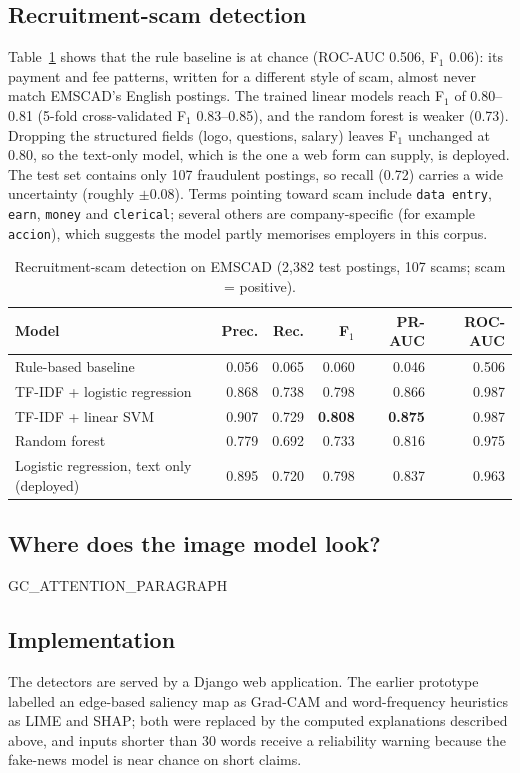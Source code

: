 \documentclass[runningheads]{llncs}
\begin{document}
\subsection{Recruitment-scam detection}
Table~\ref{tab:job} shows that the rule baseline is at chance (ROC-AUC 0.506, F$_1$ 0.06): its payment and fee patterns, written for a different style of scam, almost never match EMSCAD's English postings. The trained linear models reach F$_1$ of 0.80--0.81 (5-fold cross-validated F$_1$ 0.83--0.85), and the random forest is weaker (0.73). Dropping the structured fields (logo, questions, salary) leaves F$_1$ unchanged at 0.80, so the text-only model, which is the one a web form can supply, is deployed. The test set contains only 107 fraudulent postings, so recall (0.72) carries a wide uncertainty (roughly $\pm0.08$). Terms pointing toward scam include \texttt{data entry}, \texttt{earn}, \texttt{money} and \texttt{clerical}; several others are company-specific (for example \texttt{accion}), which suggests the model partly memorises employers in this corpus.

\begin{table}[t]
\caption{Recruitment-scam detection on EMSCAD (2,382 test postings, 107 scams; scam = positive).}\label{tab:job}
\centering
\begin{tabular}{lrrrrr}
\toprule
Model & Prec. & Rec. & F$_1$ & PR-AUC & ROC-AUC \\
\midrule
Rule-based baseline & 0.056 & 0.065 & 0.060 & 0.046 & 0.506 \\
TF-IDF + logistic regression & 0.868 & 0.738 & 0.798 & 0.866 & 0.987 \\
TF-IDF + linear SVM & 0.907 & 0.729 & \textbf{0.808} & \textbf{0.875} & 0.987 \\
Random forest & 0.779 & 0.692 & 0.733 & 0.816 & 0.975 \\
Logistic regression, text only (deployed) & 0.895 & 0.720 & 0.798 & 0.837 & 0.963 \\
\bottomrule
\end{tabular}
\end{table}

\subsection{Where does the image model look?}
GC_ATTENTION_PARAGRAPH

\subsection{Implementation}
The detectors are served by a Django web application. The earlier prototype labelled an edge-based saliency map as Grad-CAM and word-frequency heuristics as LIME and SHAP; both were replaced by the computed explanations described above, and inputs shorter than 30 words receive a reliability warning because the fake-news model is near chance on short claims.
\end{document}
